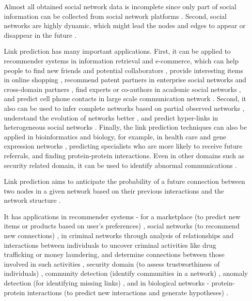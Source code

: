 Almost all obtained social network data is incomplete since only part of social information can be collected from social network platforms \cite{wang2014link}. Second, social networks are highly dynamic, which might lead the nodes and edges to appear or disappear in the future \cite{wang2014link}.

Link prediction has many important applications. First, it can be applied to recommender systems in information retrieval and e-commerce, which can help people to find new friends \cite{aiello2012friendship} and potential collaborators \cite{mori2012machine, recommendationpatent}, provide interesting items in online shopping \cite{akcora2011network}, recommend patent partners in enterprise social networks \cite{recommendationpatent} and cross-domain partners \cite{tang2012cross}, find experts or co-authors in academic social networks \cite{pavlov2007finding, wohlfarth2008semantic}, and predict cell phone contacts in large scale communication network \cite{raeder2011predictors}. Second, it also can be used to infer complete networks based on partial observed networks \cite{marchette2008predicting, kim2011network}, understand the evolution of networks better \cite{barabasi2002evolution, juszczyszyn2011link, bringmann2010learning, raymond2010fast}, and predict hyper-links in heterogeneous social networks \cite{zhu2002using}. Finally, the link prediction techniques can also be applied in bioinformatics and biology, for example, in health care and gene expression networks \cite{almansoori2012link}, predicting specialists who are more likely to receive future referrals, and finding protein-protein interactions. Even in other domains such as security related domain, it can be used to identify abnormal communications \cite{huang2009time}.

Link prediction aims to anticipate the probability of a future connection between two nodes in a given network based on their previous interactions and the network structure \cite{arrar2023comprehensive}.

It has applications in recommender systems - for a marketplace (to predict new items or products based on user’s preferences) \cite{su2020link, vahidi2021hybrid, su2019link}, social networks (to recommend new connections) \cite{abdolhosseini2020overlapping, daud2020applications}, in criminal networks through analysis of relationships and interactions between individuals to uncover criminal activities like drug trafficking or money laundering, and determine connections between those involved in such activities \cite{berlusconi2016link, lim2019hidden}, security domain (to assess trustworthiness of individuals) \cite{alnumay2019trust}, community detection (identify communities in a network) \cite{de2017community, esslimani2011densifying}, anomaly detection (for identifying missing links) \cite{huang2006link}, and in biological networks - protein-protein interactions (to predict new interactions and generate hypotheses) \cite{nasiri2021novel, cannistraci2013link}.

